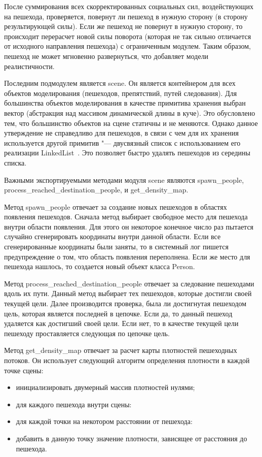После суммирования всех скорректированных социальных сил, воздействующих на пешехода, проверяется, повернут ли пешеход в нужную сторону (в сторону результирующей силы).
Если же пешеход не повернут в нужную сторону, то происходит перерасчет новой силы поворота (которая не так сильно отличается от исходного направления пешехода) с ограниченным модулем.
Таким образом, пешеход не может мгновенно развернуться, что добавляет модели реалистичности.

Последним подмодулем является scene.
Он является контейнером для всех объектов моделирования (пешеходов, препятствий, путей следования).
Для большинства объектов моделирования в качестве примитива хранения выбран вектор (абстракция над массивом динамической длины в куче).
Это обусловлено тем, что большинство объектов на сцене статичны и не меняются.
Однако данное утверждение не справедливо для пешеходов, в связи с чем для их хранения используется другой примитив "---
двусвязный список с использованием его реализации LinkedList~\cite{rust_linked_list_cargo}. Это позволяет быстро удалять пешеходов из середины списка.

Важными экспортируемыми методами модуля scene являются spa\-wn\_peo\-ple, pro\-cess\_reach\-ed\_des\-ti\-na\-ti\-on\_people, и get\_den\-si\-ty\_map.

Метод spawn\_people отвечает за создание новых пешеходов в областях появления пешеходов.
Сначала метод выбирает свободное место для пешехода внутри области появления.
Для этого он некоторое конечное число раз пытается случайно сгенерировать координаты внутри данной области.
Если все сгенерированные координаты были заняты, то в системный лог пишется предупреждение о том, что область появления переполнена.
Если же место для пешехода нашлось, то создается новый объект класса Person.

Метод process\_reached\_destination\_people отвечает за следование пешеходами вдоль их пути.
Данный метод выбирает тех пешеходов, которые достигли своей текущей цели.
Далее производится проверка, была ли достигнутая пешеходом цель, которая является последней в цепочке.
Если да, то данный пешеход удаляется как достигший своей цели. Если нет, то в качестве текущей цели пешеходу проставляется следующая по цепочке цель.

Метод get\_density\_map отвечает за расчет карты плотностей пешеходных потоков.
Он использует следующий алгоритм определения плотности в каждой точке сцены:
\begin{itemize}
  \item инициализировать двумерный массив плотностей нулями;
  \item для каждого пешехода внутри сцены:
  \item для каждой точки на некотором расстоянии от пешехода:
  \item добавить в данную точку значение плотности, зависящее от расстояния до пешехода.
\end{itemize}

